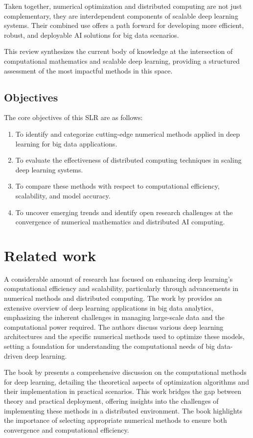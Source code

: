 \documentclass[acmsmall]{acmart}
\begin{document}
Taken together, numerical optimization and distributed computing are not just complementary, they are interdependent components
of scalable deep learning systems. Their combined use offers a path forward for developing more efficient, robust, and deployable
AI solutions for big data scenarios.

This review synthesizes the current body of knowledge at the intersection of computational mathematics and scalable deep learning,
providing a structured assessment of the most impactful methods in this space.

\subsection{Objectives}\label{subsec:objectives}
The core objectives of this SLR are as follows:

\begin{enumerate}
    \item To identify and categorize cutting-edge numerical methods applied in deep learning for big data applications.
    \item To evaluate the effectiveness of distributed computing techniques in scaling deep learning systems.
    \item To compare these methods with respect to computational efficiency, scalability, and model accuracy.
    \item To uncover emerging trends and identify open research challenges at the convergence of numerical mathematics and distributed AI computing.
\end{enumerate}

\section{Related work}\label{sec:related-work}
A considerable amount of research has focused on enhancing deep learning's computational efficiency and scalability, particularly through advancements in numerical methods and distributed computing.
The work by \citet{najafabadi2015deep} provides an extensive overview of deep learning applications in big data analytics, emphasizing the inherent challenges in managing large-scale data
and the computational power required. The authors discuss various deep learning architectures and the specific numerical methods used to optimize these models, setting a foundation for understanding
the computational needs of big data-driven deep learning.

The book by \citet{yan2023computational} presents a comprehensive discussion on the computational methods for deep learning, detailing the theoretical aspects of optimization algorithms and their implementation in practical scenarios. This work bridges the gap between theory and practical deployment, offering insights into the challenges of implementing these methods in a distributed environment. The book highlights the importance of selecting appropriate numerical methods to ensure both convergence and computational efficiency.
\end{document}
